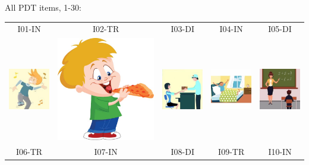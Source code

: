 \documentclass[12pt,notitlepage]{article}
\date{}
\begin{document}
All PDT items, 1-30:
\begin{center}
\begin{tabular}{|c||c||c||c||c|}
\hline
I01-IN & I02-TR & I03-DI & I04-IN & I05-DI \\
\includegraphics[width=0.13\columnwidth]{square/I01.jpg} & \includegraphics[width=0.13\columnwidth]{figures/I02.jpg} &  \includegraphics[width=0.13\columnwidth]{square/I03.jpg} &  \includegraphics[width=0.13\columnwidth]{square/I04.jpg} & \includegraphics[width=0.13\columnwidth]{square/I05.jpg} \\
\hline
\hline
I06-TR & I07-IN & I08-DI & I09-TR & I10-IN \\

\end{tabular}
\end{center}
\end{document}

